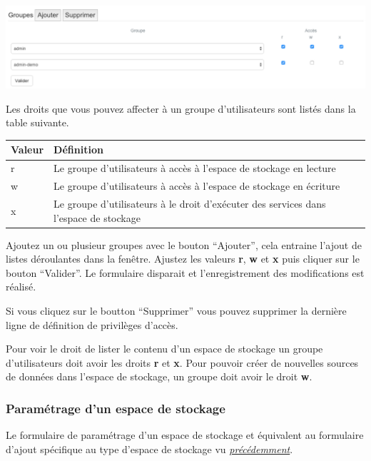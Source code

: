 \documentclass[letterpaper,10pt,french]{sphinxmanual}
\begin{document}
\includegraphics[width=1.000\linewidth]{data-privileges.png}

Les droits que vous pouvez affecter à un groupe d'utilisateurs sont
listés dans la table suivante.

\begin{tabulary}{\linewidth}{|L|L|}
\hline

\textbf{Valeur}
 & 
\textbf{Définition}
\\
\hline
r
 & 
Le groupe d'utilisateurs à accès à l'espace de stockage en lecture
\\
\hline
w
 & 
Le groupe d'utilisateurs à accès à l'espace de stockage en écriture
\\
\hline
x
 & 
Le groupe d'utilisateurs à le droit d'exécuter des services dans l'espace de stockage
\\
\hline\end{tabulary}


Ajoutez un ou plusieur groupes avec le bouton ``Ajouter'', cela entraine
l'ajout de listes déroulantes dans la fenêtre. Ajustez les valeurs
\textbf{r}, \textbf{w} et \textbf{x} puis cliquer sur le bouton ``Valider''. Le
formulaire disparait et l'enregistrement des modifications est réalisé.

Si vous cliquez sur le boutton ``Supprimer'' vous pouvez supprimer la
dernière ligne de définition de privilèges d'accès.

Pour voir le droit de lister le contenu d'un espace de stockage un
groupe d'utilisateurs doit avoir les droits \textbf{r} et \textbf{x}. Pour
pouvoir créer de nouvelles sources de données dans l'espace de
stockage, un groupe doit avoir le droit \textbf{w}.


\subsubsection{Paramétrage d'un espace de stockage}
\label{data/datastores:parametrage-d-un-espace-de-stockage}
Le formulaire de paramétrage d'un espace de stockage et équivalent au
formulaire d'ajout spécifique au type d'espace de stockage vu
{\hyperref[data/datastores:datadatastores-add]{\emph{précédemment}}}.
\end{document}
